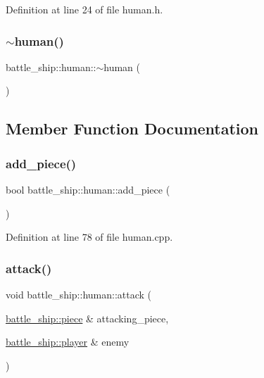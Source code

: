Definition at line 24 of file human.\+h.

\mbox{\label{classbattle__ship_1_1human_ad1c94c01291be1e1908301cffc41497d}} 
\subsubsection{\texorpdfstring{$\sim$human()}{~human()}}
{\footnotesize\ttfamily battle\+\_\+ship\+::human\+::$\sim$human (\begin{DoxyParamCaption}{ }\end{DoxyParamCaption})\hspace{0.3cm}{\ttfamily [default]}}



\subsection{Member Function Documentation}
\mbox{\label{classbattle__ship_1_1human_adaea883b2eb5fa5932a9d7239c90bfd6}} 
\subsubsection{\texorpdfstring{add\+\_\+piece()}{add\_piece()}}
{\footnotesize\ttfamily bool battle\+\_\+ship\+::human\+::add\+\_\+piece (\begin{DoxyParamCaption}{ }\end{DoxyParamCaption})}



Definition at line 78 of file human.\+cpp.

\mbox{\label{classbattle__ship_1_1human_ad89701f0c4dd688c564b14a015059386}} 
\subsubsection{\texorpdfstring{attack()}{attack()}}
{\footnotesize\ttfamily void battle\+\_\+ship\+::human\+::attack (\begin{DoxyParamCaption}\item[{\hyperlink{classbattle__ship_1_1piece}{battle\+\_\+ship\+::piece} \&}]{attacking\+\_\+piece,  }\item[{\hyperlink{classbattle__ship_1_1player}{battle\+\_\+ship\+::player} \&}]{enemy }\end{DoxyParamCaption})\hspace{0.3cm}{\ttfamily [virtual]}}



